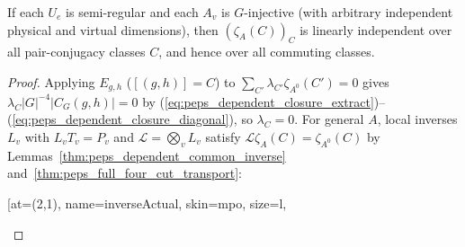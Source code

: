 \begin{lemma}%
    \label{thm:peps_dependent_closure_independent}
    \leanok
    If each $U_e$ is semi-regular and each $A_v$ is $G$-injective (with
    arbitrary independent physical and virtual dimensions), then
    $(\zeta_A(C))_C$ is linearly independent over all pair-conjugacy
    classes $C$, and hence over all commuting classes.
\end{lemma}
\begin{proof}\leanok
    Applying $E_{g,h}$ ($[(g,h)]=C$) to $\sum_{C'}\lambda_{C'}\zeta_{A^0}(C')=0$
    gives $\lambda_C|G|^{-4}|C_G(g,h)|=0$ by
    (\ref{eq:peps_dependent_closure_extract})--(\ref{eq:peps_dependent_closure_diagonal}),
    so $\lambda_C=0$. For general $A$, local inverses $L_v$ with
    $L_vT_v=P_v$ and $\mathcal L=\bigotimes_vL_v$ satisfy
    $\mathcal L\zeta_A(C)=\zeta_{A^0}(C)$ by
    Lemmas~\ref{thm:peps_dependent_common_inverse}
    and~\ref{thm:peps_full_four_cut_transport}:
    \begin{center}
        \tenkzkernel
        \begin{tenkz}[rows={bra,op,ket}, cols=1, bonds=none]
            \tn[at=(2,1), name=inverseActual, skin=mpo, size=l,

\end{tenkz}
\end{center}
\end{proof}
